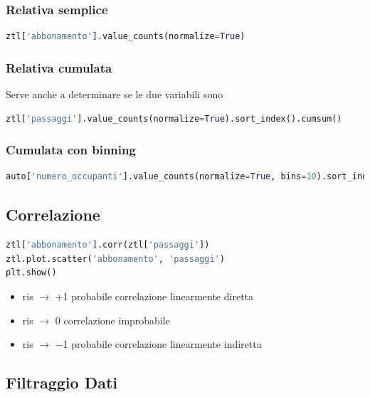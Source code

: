 \documentclass{article}
\begin{document}
\subsubsection*{Relativa semplice}
\begin{lstlisting}[language=Python]
ztl['abbonamento'].value_counts(normalize=True)
\end{lstlisting}

\subsubsection*{Relativa cumulata}

Serve anche a determinare se le due variabili sono 
\begin{lstlisting}[language=Python]
ztl['passaggi'].value_counts(normalize=True).sort_index().cumsum()
\end{lstlisting}

\subsubsection*{Cumulata con binning}
\begin{lstlisting}[language=Python]
auto['numero_occupanti'].value_counts(normalize=True, bins=10).sort_index().cumsum()
\end{lstlisting}

\subsection*{Correlazione}

\begin{lstlisting}[language=Python]
ztl['abbonamento'].corr(ztl['passaggi'])
ztl.plot.scatter('abbonamento', 'passaggi')
plt.show()
\end{lstlisting}


\begin{itemize}
    \item ris $\to$ +1 probabile correlazione linearmente diretta
    \item ris $\to$ 0 correlazione improbabile
    \item ris $\to$ −1 probabile correlazione linearmente indiretta
\end{itemize}

\subsection*{Filtraggio Dati}
\end{document}
